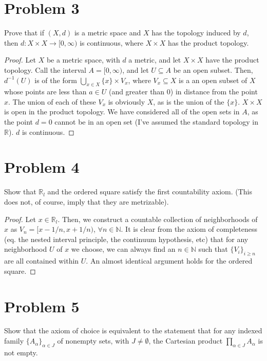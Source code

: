 \documentclass[11pt]{article}
\begin{document}
\section{Problem 3}
\label{sec:orgb6f4138}
Prove that if \((X,d)\) is a metric space and \(X\) has the topology induced by \(d\),
then \(d: X\times X\rightarrow [0, \infty)\) is continuous, where \(X\times X\) has
the product topology. 

\begin{proof}
Let \(X\) be a metric space, with \(d\) a metric, and let \(X\times X\) have the
product topology. Call the interval \(A = [0, \infty)\), and let \(U\subseteq A\) be
an open subset. Then, \(d^{-1}(U)\) is of the form \(\bigcup\limits_{x\in X}
\{x\}\times V_x\), where \(V_x \subseteq X\) is a an open subset of \(X\) whose
points are less than \(a \in U\) (and greater than 0) in distance from the point
\(x\). The union of each of these \(V_x\) is obviously \(X\), as is the union of the
\(\{x\}\). \(X\times X\) is open in the product topology. We have considered all of
the open sets in \(A\), as the point \(d = 0\) cannot be in an open set (I've
assumed the standard topology in \(\mathbb{R}\)). \(d\) is continuous. 
\end{proof}

\section{Problem 4}
\label{sec:orgff2bc0a}

Show that \(\mathbb{R}_l\) and the ordered square satisfy the first countability
axiom. (This does not, of course, imply that they are metrizable). 

\begin{proof}
Let \(x\in\mathbb{R}_l\). Then, we construct a countable collection of
neighborhoods of \(x\) as \(V_n = [x - 1/n, x + 1/n)\), \(\forall n \in \mathbb{N}\).
It is clear from the axiom of completeness (eq. the nested interval principle,
the continuum hypothesis, etc) that for any neighborhood \(U\) of \(x\) we choose,
we can always find an \(n \in \mathbb{N}\) such that \(\{V_i\}_{i \geq n}\) are all
contained within \(U\). An almost identical argument holds for the ordered square. 
\end{proof}

\section{Problem 5}
\label{sec:org3410e70}
Show that the axiom of choice is equivalent to the statement that for any
indexed family \(\{A_{\alpha}\}_{\alpha \in J}\) of nonempty sets, with \(J \not =
\emptyset\), the Cartesian product \(\prod\limits_{\alpha\in J} A_{\alpha}\) is not
empty. 
\end{document}
